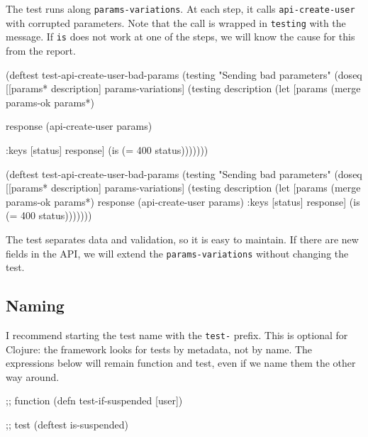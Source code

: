The test runs along \verb|params-variations|. At each step, it calls \verb|api-create-user| with corrupted parameters. Note that the call is wrapped in \verb|testing| with the message. If \verb|is| does not work at one of the steps, we will know the cause for this from the report.

\ifnarrow

\begin{english}
  \begin{clojure}
(deftest test-api-create-user-bad-params
  (testing "Sending bad parameters"
    (doseq [[params* description]
            params-variations]
      (testing description
        (let [params
              (merge params-ok params*)

              response
              (api-create-user params)

              {:keys [status]} response]
          (is (= 400 status)))))))
  \end{clojure}
\end{english}

\else

\begin{english}
  \begin{clojure}
(deftest test-api-create-user-bad-params
  (testing "Sending bad parameters"
    (doseq [[params* description] params-variations]
      (testing description
        (let [params (merge params-ok params*)
              response (api-create-user params)
              {:keys [status]} response]
          (is (= 400 status)))))))
  \end{clojure}
\end{english}

\fi

The test separates data and validation, so it is easy to maintain. If there are new fields in the API, we will extend the \verb|params-variations| without changing the test.

\subsection{Naming}

I recommend starting the test name with the \verb|test-| prefix. This is optional for Clojure: the framework looks for tests by metadata, not by name. The expressions below will remain function and test, even if we name them the other way around.

\ifnarrow

\begin{english}
  \begin{clojure}
;; function
(defn test-if-suspended [user])

;; test
(deftest is-suspended)
  \end{clojure}
\end{english}


